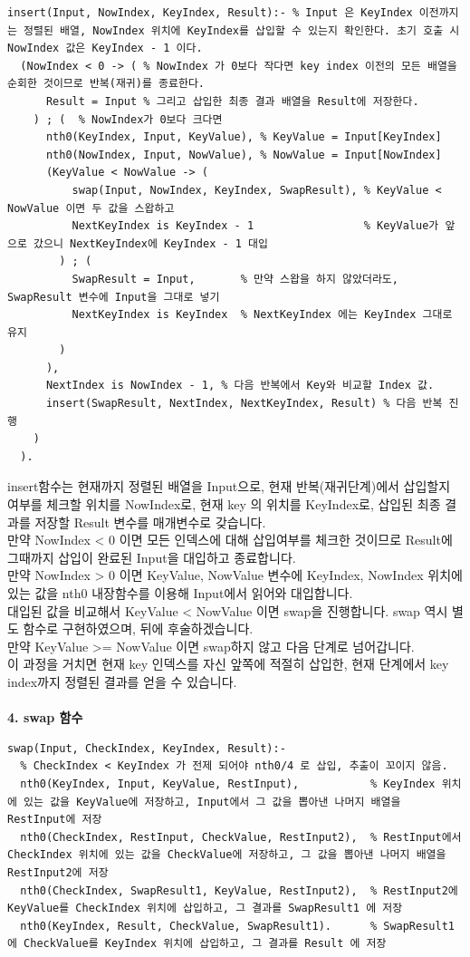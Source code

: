 \documentclass{article}
\begin{document}
\begin{verbatim}
insert(Input, NowIndex, KeyIndex, Result):- % Input 은 KeyIndex 이전까지는 정렬된 배열, NowIndex 위치에 KeyIndex를 삽입할 수 있는지 확인한다. 초기 호출 시 NowIndex 값은 KeyIndex - 1 이다.
  (NowIndex < 0 -> ( % NowIndex 가 0보다 작다면 key index 이전의 모든 배열을 순회한 것이므로 반복(재귀)를 종료한다.
      Result = Input % 그리고 삽입한 최종 결과 배열을 Result에 저장한다.
    ) ; (  % NowIndex가 0보다 크다면
      nth0(KeyIndex, Input, KeyValue), % KeyValue = Input[KeyIndex]
      nth0(NowIndex, Input, NowValue), % NowValue = Input[NowIndex]
      (KeyValue < NowValue -> (
          swap(Input, NowIndex, KeyIndex, SwapResult), % KeyValue < NowValue 이면 두 값을 스왑하고
          NextKeyIndex is KeyIndex - 1                 % KeyValue가 앞으로 갔으니 NextKeyIndex에 KeyIndex - 1 대입
        ) ; (
          SwapResult = Input,       % 만약 스왑을 하지 않았더라도, SwapResult 변수에 Input을 그대로 넣기
          NextKeyIndex is KeyIndex  % NextKeyIndex 에는 KeyIndex 그대로 유지
        )
      ),
      NextIndex is NowIndex - 1, % 다음 반복에서 Key와 비교할 Index 값.
      insert(SwapResult, NextIndex, NextKeyIndex, Result) % 다음 반복 진행
    )
  ).
\end{verbatim}
insert함수는 현재까지 정렬된 배열을 Input으로, 현재 반복(재귀단계)에서 삽입할지 여부를 체크할 위치를 NowIndex로, 현재 key 의 위치를 KeyIndex로, 삽입된 최종 결과를 저장할 Result 변수를 매개변수로 갖습니다.\\
만약 NowIndex < 0 이면 모든 인덱스에 대해 삽입여부를 체크한 것이므로 Result에 그때까지 삽입이 완료된 Input을 대입하고 종료합니다.\\
만약 NowIndex > 0 이면 KeyValue, NowValue 변수에 KeyIndex, NowIndex 위치에 있는 값을 nth0 내장함수를 이용해 Input에서 읽어와 대입합니다.\\
대입된 값을 비교해서 KeyValue < NowValue 이면 swap을 진행합니다. swap 역시 별도 함수로 구현하였으며, 뒤에 후술하겠습니다.\\
만약 KeyValue >= NowValue 이면 swap하지 않고 다음 단계로 넘어갑니다.\\
이 과정을 거치면 현재 key 인덱스를 자신 앞쪽에 적절히 삽입한, 현재 단계에서 key index까지 정렬된 결과를 얻을 수 있습니다.\\\\
\textbf{4. swap 함수}
\begin{verbatim}
swap(Input, CheckIndex, KeyIndex, Result):-
  % CheckIndex < KeyIndex 가 전제 되어야 nth0/4 로 삽입, 추출이 꼬이지 않음.
  nth0(KeyIndex, Input, KeyValue, RestInput),           % KeyIndex 위치에 있는 값을 KeyValue에 저장하고, Input에서 그 값을 뽑아낸 나머지 배열을 RestInput에 저장
  nth0(CheckIndex, RestInput, CheckValue, RestInput2),  % RestInput에서 CheckIndex 위치에 있는 값을 CheckValue에 저장하고, 그 값을 뽑아낸 나머지 배열을 RestInput2에 저장
  nth0(CheckIndex, SwapResult1, KeyValue, RestInput2),  % RestInput2에 KeyValue를 CheckIndex 위치에 삽입하고, 그 결과를 SwapResult1 에 저장
  nth0(KeyIndex, Result, CheckValue, SwapResult1).      % SwapResult1에 CheckValue를 KeyIndex 위치에 삽입하고, 그 결과를 Result 에 저장
\end{verbatim}
\end{document}
